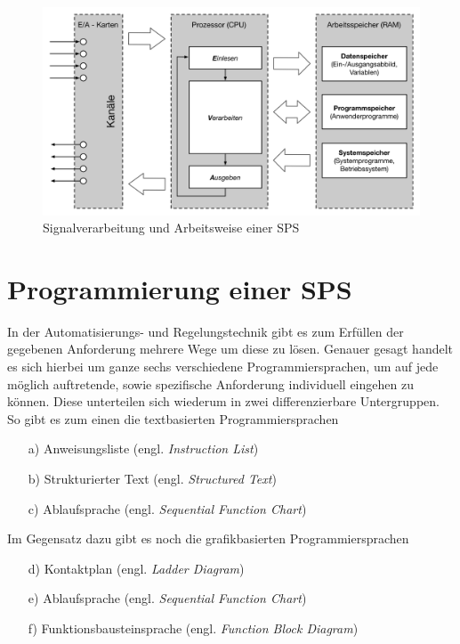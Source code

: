 	\begin{figure}[h!]
  		\centering
    	\includegraphics[width=1\textwidth]{graphics/stateoftheart/Signalverarbeitung_Selfmade.png}
  		\caption{Signalverarbeitung und Arbeitsweise einer SPS \cite{mseitz_sps}}
	\end{figure}
		
	\newpage
	\section{Programmierung einer SPS}

	In der Automatisierungs- und Regelungstechnik gibt es zum Erfüllen der gegebenen Anforderung mehrere Wege um diese zu lösen. Genauer gesagt handelt es sich hierbei um ganze sechs verschiedene Programmiersprachen, um auf jede möglich auftretende, sowie spezifische Anforderung individuell eingehen zu können. Diese unterteilen sich wiederum in zwei differenzierbare Untergruppen. So gibt es zum einen die textbasierten Programmiersprachen
	
	\begin{itemize}
		\item[a)] Anweisungsliste (engl. \textit{Instruction List})
		\item[b)] Strukturierter Text (engl. \textit{Structured Text})
		\item[c)] Ablaufsprache (engl. \textit{Sequential Function Chart})
	\end{itemize}

	Im Gegensatz dazu gibt es noch die grafikbasierten Programmiersprachen
	
	\begin{itemize}
		\item[d)] Kontaktplan (engl. \textit{Ladder Diagram})
		\item[e)] Ablaufsprache (engl. \textit{Sequential Function Chart})
		\item[f)] Funktionsbausteinsprache (engl. \textit{Function Block Diagram})
	\end{itemize}
	
